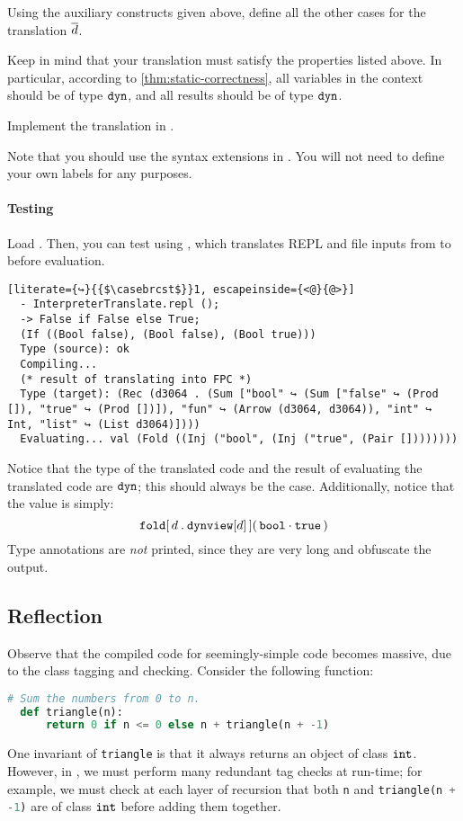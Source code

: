 \documentclass[11pt]{article}
\begin{document}
 Using the auxiliary constructs given above, define all the other cases for the translation $\overline{d}$.
\begin{hint}
  Keep in mind that your translation must satisfy the properties listed above.
  In particular, according to \cref{thm:static-correctness}, all variables in the context should be of type $\mathtt{dyn}$, and all results should be of type $\mathtt{dyn}$.
\end{hint}


 Implement the translation in .

Note that you should use the syntax extensions in .
You will not need to define your own labels for any purposes.

\paragraph{Testing}
Load .
Then, you can test using , which translates REPL and file inputs from \LangPyCF{} to \LangFPC{} before evaluation.
\begin{lstlisting}[literate={↪}{{$\casebrcst$}}1, escapeinside={<@}{@>}]
  - InterpreterTranslate.repl ();
  -> False if False else True;
  (If ((Bool false), (Bool false), (Bool true)))
  Type (source): ok
  Compiling...
  (* result of translating into FPC *)
  Type (target): (Rec (d3064 . (Sum ["bool" ↪ (Sum ["false" ↪ (Prod []), "true" ↪ (Prod [])]), "fun" ↪ (Arrow (d3064, d3064)), "int" ↪ Int, "list" ↪ (List d3064)])))
  Evaluating... val (Fold ((Inj ("bool", (Inj ("true", (Pair [])))))))
\end{lstlisting}
Notice that the type of the translated code and the result of evaluating the translated code are $\mathtt{dyn}$; this should always be the case.
Additionally, notice that the value is simply:
\[ {\mathtt{fold}}\mathtt{[}\,{{d}\mathbin{\mathtt{.}}{\mathtt{dynview}[d]}}\,\mathtt{]}\mathtt{(}\,{\mathtt{bool}}\mathbin{\cdot}{\mathtt{true}}\,\mathtt{)} \]
Type annotations are \emph{not} printed, since they are very long and obfuscate the output.

\subsection{Reflection}

Observe that the compiled code for seemingly-simple \LangPyCF{} code becomes massive, due to the class tagging and checking.
Consider the following function:
\begin{lstlisting}[language=Python]
  # Sum the numbers from 0 to n.
  def triangle(n):
      return 0 if n <= 0 else n + triangle(n + -1)
\end{lstlisting}
One invariant of \lstinline[language=Python]|triangle| is that it always returns an object of class $\mathtt{int}$.
However, in \LangPyCF{}, we must perform many redundant tag checks at run-time; for example, we must check at each layer of recursion that both \lstinline[language=Python]|n| and \lstinline[language=Python]|triangle(n + -1)| are of class $\mathtt{int}$ before adding them together.
\end{document}
